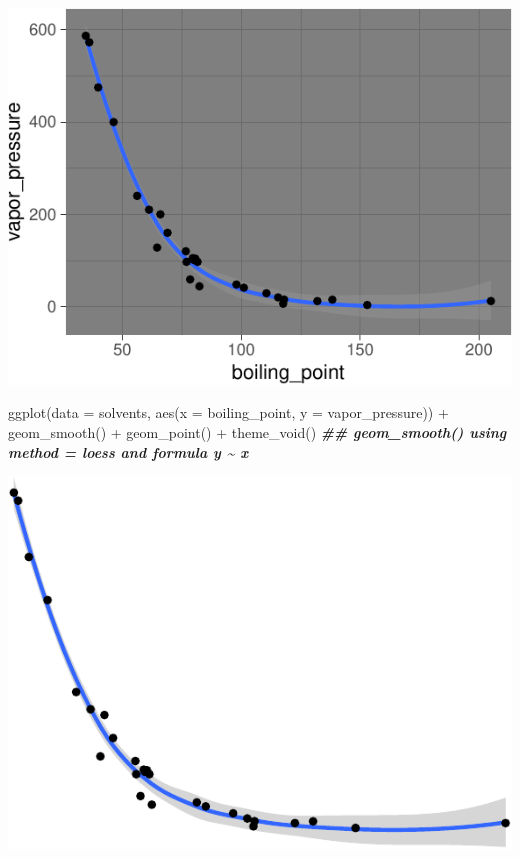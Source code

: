 \documentclass[
]{krantz}
\newenvironment{Shaded}{\begin{snugshade}}{\end{snugshade}}
\newcommand{\AttributeTok}[1]{\textcolor[rgb]{0.77,0.63,0.00}{#1}}
\newcommand{\DocumentationTok}[1]{\textcolor[rgb]{0.56,0.35,0.01}{\textbf{\textit{#1}}}}
\newcommand{\FunctionTok}[1]{\textcolor[rgb]{0.00,0.00,0.00}{#1}}
\newcommand{\NormalTok}[1]{#1}
\newcommand{\SpecialCharTok}[1]{\textcolor[rgb]{0.00,0.00,0.00}{#1}}
\begin{document}
\begin{center}\includegraphics[width=0.8\linewidth]{index_files/figure-latex/unnamed-chunk-64-1} \end{center}

\begin{Shaded}
\begin{Highlighting}[]
\FunctionTok{ggplot}\NormalTok{(}\AttributeTok{data =}\NormalTok{ solvents, }\FunctionTok{aes}\NormalTok{(}\AttributeTok{x =}\NormalTok{ boiling\_point, }\AttributeTok{y =}\NormalTok{ vapor\_pressure)) }\SpecialCharTok{+} 
  \FunctionTok{geom\_smooth}\NormalTok{() }\SpecialCharTok{+}
  \FunctionTok{geom\_point}\NormalTok{() }\SpecialCharTok{+}
  \FunctionTok{theme\_void}\NormalTok{()}
\DocumentationTok{\#\# \textasciigrave{}geom\_smooth()\textasciigrave{} using method = \textquotesingle{}loess\textquotesingle{} and formula \textquotesingle{}y \textasciitilde{} x\textquotesingle{}}
\end{Highlighting}
\end{Shaded}

\begin{center}\includegraphics[width=0.8\linewidth]{index_files/figure-latex/unnamed-chunk-65-1} \end{center}
\end{document}
